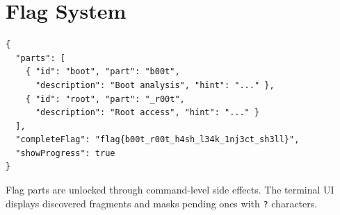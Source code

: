 \section{Flag System}\label{sec:app-tc-flags}

\noindent\begin{minipage}{\linewidth}
\begin{lstlisting}[language={}, caption={Flag system definition.}]
{
  "parts": [
    { "id": "boot", "part": "b00t",
      "description": "Boot analysis", "hint": "..." },
    { "id": "root", "part": "_r00t",
      "description": "Root access", "hint": "..." }
  ],
  "completeFlag": "flag{b00t_r00t_h4sh_l34k_1nj3ct_sh3ll}",
  "showProgress": true
}
\end{lstlisting}
\end{minipage}

Flag parts are unlocked through command-level side effects. The terminal UI displays discovered fragments and masks pending ones with \texttt{?} characters.
